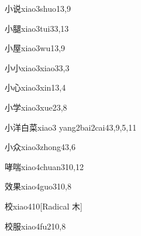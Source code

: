 \begin{entry}{小说}{xiao3shuo1}{3,9}
\end{entry}

\begin{entry}{小腿}{xiao3tui3}{3,13}
\end{entry}

\begin{entry}{小屋}{xiao3wu1}{3,9}
\end{entry}

\begin{entry}{小小}{xiao3xiao3}{3,3}
\end{entry}

\begin{entry}{小心}{xiao3xin1}{3,4}
\end{entry}

\begin{entry}{小学}{xiao3xue2}{3,8}
\end{entry}

\begin{entry}{小洋白菜}{xiao3 yang2bai2cai4}{3,9,5,11}
\end{entry}

\begin{entry}{小众}{xiao3zhong4}{3,6}
\end{entry}

\begin{entry}{哮喘}{xiao4chuan3}{10,12}
\end{entry}

\begin{entry}{效果}{xiao4guo3}{10,8}
\end{entry}

\begin{entry}{校}{xiao4}{10}[Radical 木]
\end{entry}

\begin{entry}{校服}{xiao4fu2}{10,8}
\end{entry}

